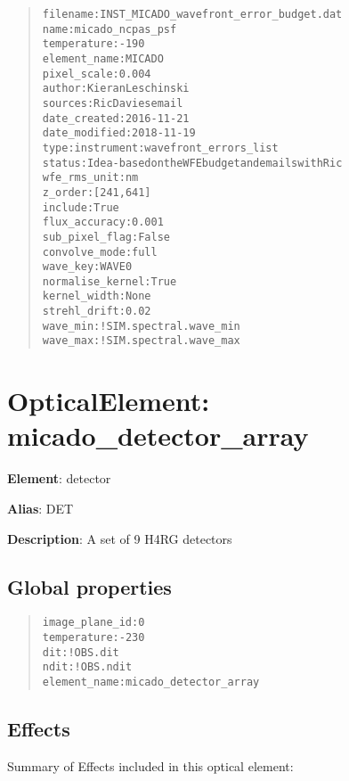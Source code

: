 \documentclass[a4paper]{article}
\begin{document}
\begin{quote}
\begin{alltt}
        filename : INST_MICADO_wavefront_error_budget.dat
            name : micado_ncpas_psf
     temperature : -190
    element_name : MICADO
     pixel_scale : 0.004
          author : Kieran Leschinski
         sources : Ric Davies email
    date_created : 2016-11-21
   date_modified : 2018-11-19
            type : instrument:wavefront_errors_list
          status : Idea - based on the WFE budget and emails with Ric
    wfe_rms_unit : nm
         z_order : [241, 641]
         include : True
   flux_accuracy : 0.001
  sub_pixel_flag : False
   convolve_mode : full
        wave_key : WAVE0
normalise_kernel : True
    kernel_width : None
    strehl_drift : 0.02
        wave_min : !SIM.spectral.wave_min
        wave_max : !SIM.spectral.wave_max
\end{alltt}
\end{quote}


\section{OpticalElement: \textquotedbl{}micado\_detector\_array\textquotedbl{}%
  \label{opticalelement-micado-detector-array}%
}

\textbf{Element}: detector

\textbf{Alias}: DET

\textbf{Description}: A set of 9 H4RG detectors


\subsection{Global properties%
  \label{id21}%
}

\begin{quote}
\begin{alltt}
image_plane_id : 0
   temperature : -230
           dit : !OBS.dit
          ndit : !OBS.ndit
  element_name : micado_detector_array
\end{alltt}
\end{quote}


\subsection{Effects%
  \label{id22}%
}

Summary of Effects included in this optical element:
\end{document}

